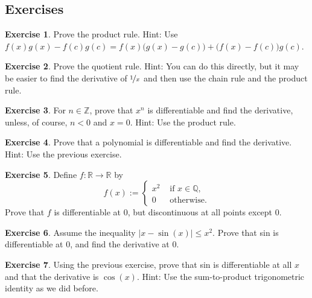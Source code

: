 \documentclass[12pt]{book}
\newcommand{\abs}[1]{\left\lvert {#1} \right\rvert}
\newcommand{\R}{{\mathbb{R}}}
\newcommand{\Z}{{\mathbb{Z}}}
\newcommand{\Q}{{\mathbb{Q}}}
\theoremstyle{plain}
\theoremstyle{remark}
\theoremstyle{definition}
\theoremstyle{exercise}
\newtheorem{exercise}{Exercise}[section]
\theoremstyle{example}
\begin{document}
\subsection{Exercises}

\begin{exercise}
Prove the product rule.
Hint: Use
$f(x) g(x) - f(c) g(c) = f(x)\bigl( g(x) - g(c) \bigr) + \bigl( f(x) -
f(c) \bigr) g(c)$.
\end{exercise}

\begin{exercise}
Prove the quotient rule.  Hint: You can do this directly, but it may be
easier to find the derivative of $\nicefrac{1}{x}$ and then use
the chain rule and the product rule.
\end{exercise}

\begin{exercise} \label{exercise:diffofxn}
For $n \in \Z$,
prove that $x^n$ is differentiable and find the derivative,
unless, of course, $n < 0$ and $x=0$.
Hint: Use the product rule.
\end{exercise}

\begin{exercise}
Prove that a polynomial is differentiable and find the derivative.
Hint: Use the previous exercise.
\end{exercise}

\begin{exercise}
Define $f \colon \R \to \R$ by
\begin{equation*}
f(x) :=
\begin{cases}
x^2 & \text{ if $x \in \Q$,}\\
0 & \text{ otherwise.}
\end{cases}
\end{equation*}
Prove that $f$ is differentiable at $0$, but discontinuous at all points
except $0$.
\end{exercise}

\begin{exercise}
Assume the inequality $\abs{x-\sin(x)} \leq x^2$.  Prove that sin is
differentiable at $0$, and find the derivative at $0$.
\end{exercise}

\begin{exercise}
Using the previous exercise, prove that sin is differentiable at all $x$
and that the derivative is $\cos(x)$.  Hint: Use the sum-to-product
trigonometric identity as we did before.
\end{exercise}
\end{document}
